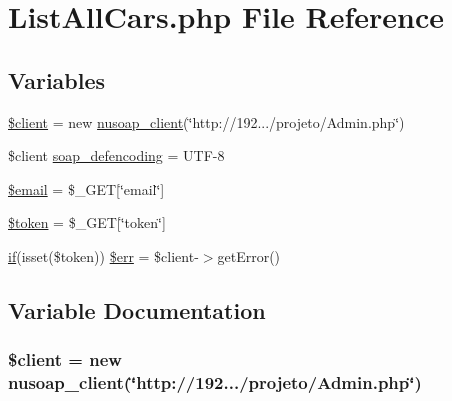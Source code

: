 \hypertarget{_list_all_cars_8php}{}\section{List\+All\+Cars.\+php File Reference}
\label{_list_all_cars_8php}
\subsection*{Variables}
\begin{DoxyCompactItemize}
\item 
\hyperlink{_list_all_cars_8php_ad1405dc1ba2e288764378e79bff7a87d}{\$client} = new \hyperlink{classnusoap__client}{nusoap\+\_\+client}(\char`\"{}http\+://192.../projeto/Admin.\+php\char`\"{})
\item 
\$client \hyperlink{_list_all_cars_8php_a944cce1b9c1aa5e93c77ace20ce99989}{soap\+\_\+defencoding} = \textquotesingle{}U\+T\+F-\/8\textquotesingle{}
\item 
\hyperlink{_list_all_cars_8php_ad634f418b20382e2802f80532d76d3cd}{\$email} = \$\+\_\+\+G\+E\+T\mbox{[}\char`\"{}email\char`\"{}\mbox{]}
\item 
\hyperlink{_list_all_cars_8php_a00ae4fcafb1145f5e968bdf920f83e2e}{\$token} = \$\+\_\+\+G\+E\+T\mbox{[}\char`\"{}token\char`\"{}\mbox{]}
\item 
\hyperlink{_viagem_8php_a88cb244e17cabaf4dee5fb3acb8168e0}{if}(isset(\$token)) \hyperlink{_list_all_cars_8php_a83cc27ac51f837246f548088b8d7a674}{\$err} = \$client-\/$>$get\+Error()
\end{DoxyCompactItemize}


\subsection{Variable Documentation}
\hypertarget{_list_all_cars_8php_ad1405dc1ba2e288764378e79bff7a87d}{}
\subsubsection[{\$client}]{\setlength{\rightskip}{0pt plus 5cm}\$client = new {\bf nusoap\+\_\+client}(\char`\"{}http\+://192.../projeto/Admin.\+php\char`\"{})}\label{_list_all_cars_8php_ad1405dc1ba2e288764378e79bff7a87d}
\hypertarget{_list_all_cars_8php_ad634f418b20382e2802f80532d76d3cd}{}
